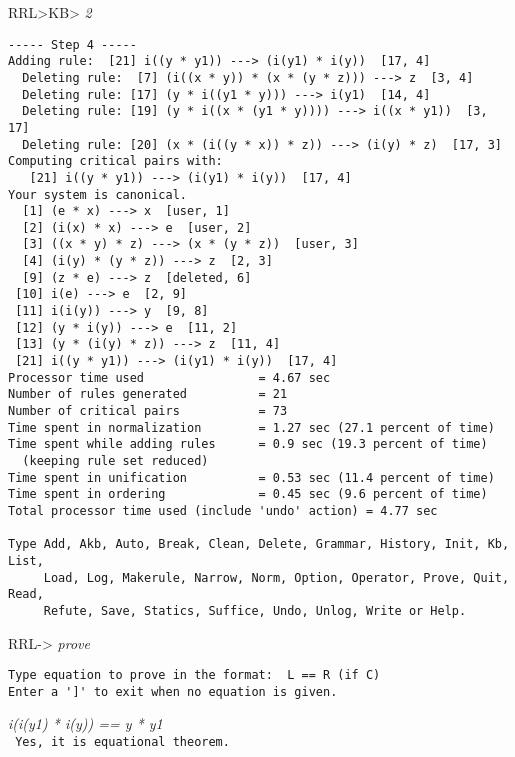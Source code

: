 RRL>KB> {\em 2}
\begin{verbatim}
----- Step 4 -----
Adding rule:  [21] i((y * y1)) ---> (i(y1) * i(y))  [17, 4]
  Deleting rule:  [7] (i((x * y)) * (x * (y * z))) ---> z  [3, 4]  
  Deleting rule: [17] (y * i((y1 * y))) ---> i(y1)  [14, 4]
  Deleting rule: [19] (y * i((x * (y1 * y)))) ---> i((x * y1))  [3, 17]
  Deleting rule: [20] (x * (i((y * x)) * z)) ---> (i(y) * z)  [17, 3]
Computing critical pairs with: 
   [21] i((y * y1)) ---> (i(y1) * i(y))  [17, 4]
Your system is canonical.
  [1] (e * x) ---> x  [user, 1]
  [2] (i(x) * x) ---> e  [user, 2]
  [3] ((x * y) * z) ---> (x * (y * z))  [user, 3]
  [4] (i(y) * (y * z)) ---> z  [2, 3]
  [9] (z * e) ---> z  [deleted, 6]
 [10] i(e) ---> e  [2, 9]
 [11] i(i(y)) ---> y  [9, 8]
 [12] (y * i(y)) ---> e  [11, 2]
 [13] (y * (i(y) * z)) ---> z  [11, 4]
 [21] i((y * y1)) ---> (i(y1) * i(y))  [17, 4]
Processor time used                = 4.67 sec
Number of rules generated          = 21
Number of critical pairs           = 73
Time spent in normalization        = 1.27 sec (27.1 percent of time)
Time spent while adding rules      = 0.9 sec (19.3 percent of time)
  (keeping rule set reduced)
Time spent in unification          = 0.53 sec (11.4 percent of time)
Time spent in ordering             = 0.45 sec (9.6 percent of time)
Total processor time used (include 'undo' action) = 4.77 sec

Type Add, Akb, Auto, Break, Clean, Delete, Grammar, History, Init, Kb, List,
     Load, Log, Makerule, Narrow, Norm, Option, Operator, Prove, Quit, Read,
     Refute, Save, Statics, Suffice, Undo, Unlog, Write or Help.
\end{verbatim}
RRL-> {\em prove} 
\begin{verbatim}
Type equation to prove in the format:  L == R (if C) 
Enter a ']' to exit when no equation is given.
\end{verbatim}
{\em i(i(y1) * i(y)) == y * y1} \\
\tt
Yes, it is equational theorem.
\rm
\normalsize
